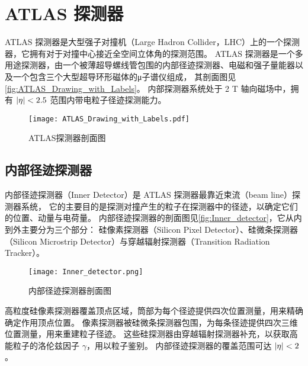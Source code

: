 
\chapter{ATLAS 探测器}
ATLAS 探测器是大型强子对撞机（Large Hadron Collider，LHC）上的一个探测器，它拥有对于对撞中心接近全空间立体角的探测范围。
ATLAS 探测器是一个多用途探测器，由一个被薄超导螺线管包围的内部径迹探测器、电磁和强子量能器以及一个包含三个大型超导环形磁体的μ子谱仪组成，
其剖面图见\autoref{fig:ATLAS_Drawing_with_Labels}。
内部探测器系统处于 2 T 轴向磁场中，拥有 $\abs{\eta} < 2.5$ 范围内带电粒子径迹探测能力。
\cite{ATLAS_detector}

\begin{figure}[ht]
    \centering
    \texttt{[image: ATLAS\_Drawing\_with\_Labels.pdf]}
    \caption{ATLAS探测器剖面图\cite{ATLAS_detector}}
    \label{fig:ATLAS_Drawing_with_Labels}
\end{figure}


\section{内部径迹探测器}
内部径迹探测器（Inner Detector）是 ATLAS 探测器最靠近束流（beam line）探测器系统，
它的主要目的是探测对撞产生的粒子在探测器中的径迹，以确定它们的位置、动量与电荷量。
内部径迹探测器的剖面图见\autoref{fig:Inner_detector}，它从内到外主要分为三个部分：
硅像素探测器（Silicon Pixel Detector）、硅微条探测器（Silicon Microstrip Detector）与穿越辐射探测器（Transition Radiation Tracker）。

\begin{figure}[ht]
    \centering
    \texttt{[image: Inner\_detector.png]}
    \caption{内部径迹探测器剖面图\cite{ATLAS_detector}}
    \label{fig:Inner_detector}
\end{figure}

高粒度硅像素探测器覆盖顶点区域，筒部为每个径迹提供四次位置测量，用来精确确定作用顶点位置。
像素探测器被硅微条探测器包围，为每条径迹提供四次三维位置测量，用来重建粒子径迹。
这些硅探测器由穿越辐射探测器补充，以获取高能粒子的洛伦兹因子 $\gamma$，用以粒子鉴别。
内部径迹探测器的覆盖范围可达 $\abs{\eta} < 2$。



